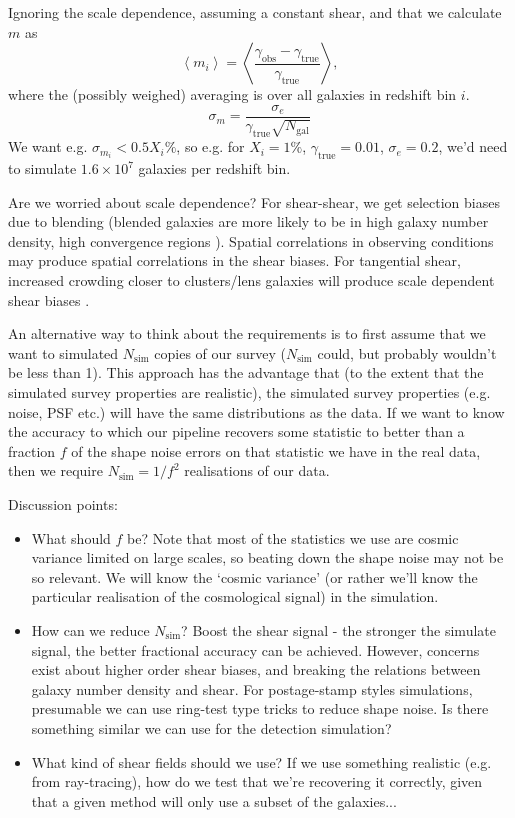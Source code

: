 \documentclass[\docopts]{\docclass}
\begin{document}
Ignoring the scale dependence, assuming a constant shear, and that we calculate $m$ as
\begin{equation}
\left<m_i\right> = \left<\frac{\gamma_{\mathrm{obs}}-\gamma_{\mathrm{true}}}{\gamma_{\mathrm{true}}}\right>,
\end{equation}
where the (possibly weighed) averaging is over all galaxies in redshift bin $i$.
\begin{equation}
\sigma_m = \frac{\sigma_e}{\gamma_{\mathrm{true}} \sqrt{N_{\mathrm{gal}}}}
\end{equation}
We want e.g. $\sigma_{m_i} < 0.5 X_i\%$, so e.g. for $X_i = 1\%$, $\gamma_{\mathrm{true}}=0.01$, $\sigma_e = 0.2$, we'd need to simulate $1.6\times10^7$ galaxies per redshift bin.

Are we worried about scale dependence? For shear-shear, we get selection biases due to blending (blended galaxies are more likely to be in high galaxy number density, high convergence regions \citep{hartlap2011,maccrann2017}). Spatial correlations in observing conditions may produce spatial correlations in the shear biases. For tangential shear, increased crowding closer to clusters/lens galaxies will produce scale dependent shear biases \citep{melchior2015,simet2015}.

An alternative way to think about the requirements is to first assume that we want to simulated $N_{\mathrm{sim}}$ copies of our survey ($N_{\mathrm{sim}}$ could, but probably wouldn't be less than 1). This approach has the advantage that (to the extent that the simulated survey properties are realistic), the simulated survey properties (e.g. noise, PSF etc.) will have the same distributions as the data. If we want to know the accuracy to which our pipeline recovers some statistic  to better than a fraction $f$ of the shape noise errors on that statistic we have in the real data, then we require $N_{\mathrm{sim}} = 1/f^2$ realisations of our data. 

Discussion points:
\begin{itemize}
\item{What should $f$ be? Note that most of the statistics we use are cosmic variance limited on large scales, so beating down the shape noise may not be so relevant. We will know the `cosmic variance' (or rather we'll know the particular realisation of the cosmological signal) in the simulation.}
\item{How can we reduce $N_{\mathrm{sim}}$? Boost the shear signal - the stronger the simulate signal, the better fractional accuracy can be achieved. However, concerns exist about higher order shear biases, and breaking the relations between galaxy number density and shear. For postage-stamp styles simulations, presumable we can use ring-test type tricks to reduce shape noise. Is there something similar we can use for the detection simulation?}
\item{What kind of shear fields should we use? If we use something realistic (e.g. from ray-tracing), how do we test that we're recovering it correctly, given that a given method will only use a subset of the galaxies...}
\end{itemize}
\end{document}
